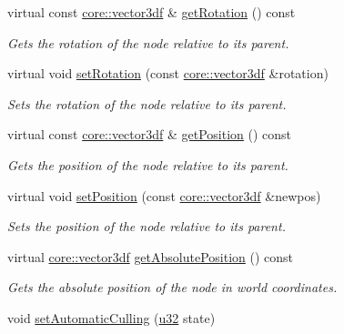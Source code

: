 \begin{DoxyCompactItemize}
virtual const \hyperlink{namespaceirr_1_1core_a06f169d08b5c429f5575acb7edbad811}{core\+::vector3df} \& \hyperlink{classirr_1_1scene_1_1ISceneNode_acfef9f174e2398b479915791e4084061}{get\+Rotation} () const
\begin{DoxyCompactList}\small\item\em Gets the rotation of the node relative to its parent. \end{DoxyCompactList}\item 
virtual void \hyperlink{classirr_1_1scene_1_1ISceneNode_adb6ff54f52d3a9e1514cd487a550935c}{set\+Rotation} (const \hyperlink{namespaceirr_1_1core_a06f169d08b5c429f5575acb7edbad811}{core\+::vector3df} \&rotation)
\begin{DoxyCompactList}\small\item\em Sets the rotation of the node relative to its parent. \end{DoxyCompactList}\item 
virtual const \hyperlink{namespaceirr_1_1core_a06f169d08b5c429f5575acb7edbad811}{core\+::vector3df} \& \hyperlink{classirr_1_1scene_1_1ISceneNode_af5686d35e868e7d295c2d2cb84799d20}{get\+Position} () const
\begin{DoxyCompactList}\small\item\em Gets the position of the node relative to its parent. \end{DoxyCompactList}\item 
virtual void \hyperlink{classirr_1_1scene_1_1ISceneNode_a2166eb0a92cc0e46c49266f41a68ed50}{set\+Position} (const \hyperlink{namespaceirr_1_1core_a06f169d08b5c429f5575acb7edbad811}{core\+::vector3df} \&newpos)
\begin{DoxyCompactList}\small\item\em Sets the position of the node relative to its parent. \end{DoxyCompactList}\item 
virtual \hyperlink{namespaceirr_1_1core_a06f169d08b5c429f5575acb7edbad811}{core\+::vector3df} \hyperlink{classirr_1_1scene_1_1ISceneNode_a09a1c2ce3cf5448197a0c7b0bb16a516}{get\+Absolute\+Position} () const
\begin{DoxyCompactList}\small\item\em Gets the absolute position of the node in world coordinates. \end{DoxyCompactList}\item 
void \hyperlink{classirr_1_1scene_1_1ISceneNode_a5fcd62dbf524b8d2d6daa61c7d6cf119}{set\+Automatic\+Culling} (\hyperlink{namespaceirr_a0416a53257075833e7002efd0a18e804}{u32} state)

\end{DoxyCompactItemize}
